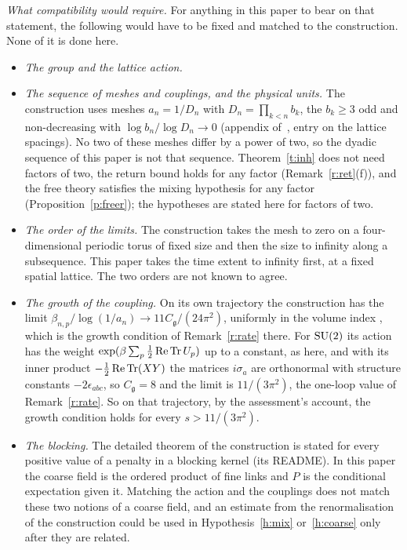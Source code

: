 \emph{What compatibility would require.} For anything in this paper to bear on that statement, the following
would have to be fixed and matched to the construction. None of it is done here.
\begin{itemize}
\item \emph{The group and the lattice action.}
\item \emph{The sequence of meshes and couplings, and the physical units.} The construction uses meshes
$a_n=1/D_n$ with $D_n=\prod_{k<n}b_k$, the $b_k\ge3$ odd and non-decreasing with $\log b_n/\log D_n\to0$
(appendix of~\cite{YMG}, entry on the lattice spacings). No two of these meshes differ by a power of two, so the dyadic sequence of this paper is
not that sequence. Theorem~\ref{t:inh} does not need factors of two, the return bound holds for any factor
(Remark~\ref{r:ret}(f)), and the free theory satisfies the mixing hypothesis for any factor
(Proposition~\ref{p:freer}); the hypotheses are stated here for factors of two.
\item \emph{The order of the limits.} The construction takes the mesh to zero on a four-dimensional periodic torus
of fixed size and then the size to infinity along a subsequence. This paper takes the time extent to infinity
first, at a fixed spatial lattice. The two orders are not known to agree.
\item \emph{The growth of the coupling.} On its own trajectory the construction has the limit
$\beta_{n,p}/\log(1/a_n)\to11C_{\mathfrak g}/(24\pi^2)$, uniformly in the volume index
\cite[Theorem~4.1, eq.~(7)]{YMG}, which is the growth condition of Remark~\ref{r:rate} there. For
$\mathrm{SU}(2)$ its action~\cite[eq.~(3)]{YMG} has the weight $\exp(\beta\sum_p\tfrac12\operatorname{Re}\operatorname{Tr} U_p)$
up to a constant, as here, and with its inner product $-\tfrac12\operatorname{Re}\operatorname{Tr}(XY)$ the matrices
$i\sigma_a$ are orthonormal with structure constants $-2\epsilon_{abc}$, so $C_{\mathfrak g}=8$ and the limit
is $11/(3\pi^2)$, the one-loop value of Remark~\ref{r:rate}. So on that trajectory, by the assessment's
account, the growth condition holds for every $s>11/(3\pi^2)$.
\item \emph{The blocking.} The detailed theorem of the construction is stated for every positive value of a
penalty in a blocking kernel (its README). In this paper the coarse field is the ordered product of fine
links and $P$ is the conditional expectation given it. Matching the action and the couplings does not match
these two notions of a coarse field, and an estimate from the renormalisation of the construction could be
used in Hypothesis~\ref{h:mix} or~\ref{h:coarse} only after they are related.


\end{itemize}
